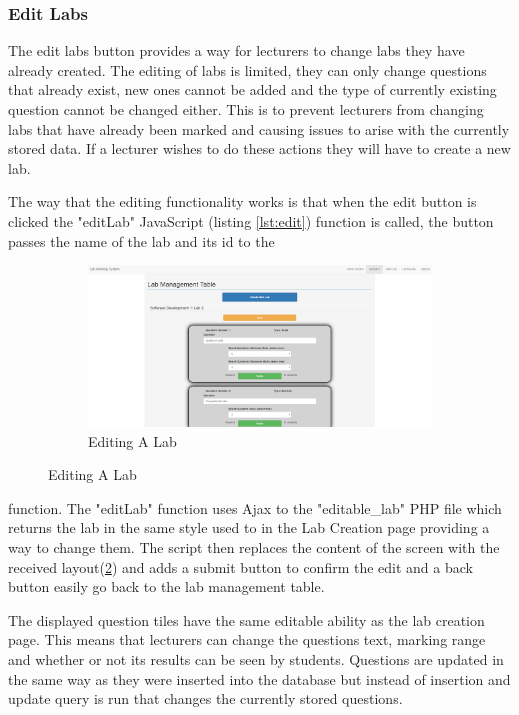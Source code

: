 \documentclass[12pt]{article}  %
\begin{document}
\subsubsection{Edit Labs}
The edit labs button provides a way for lecturers to change labs they have already created. The editing of labs is limited, they can only change questions that already exist, new ones cannot be added and the type of currently existing question cannot be changed either. This is to prevent lecturers from changing labs that have already been marked and causing issues to arise with the currently stored data. If a lecturer wishes to do these actions they will have to create a new lab.



\noindent The way that the editing functionality works is that when  the edit button is clicked the "editLab" JavaScript (listing \ref{lst:edit}) function is called, the button passes the name of the lab and its id to the

\begin{figure}
\vspace*{-\baselineskip}
\begin{figure}[H]
    \centering
    \includegraphics[width=1\textwidth]{images/implementation/edit-lab-page.png}
    \caption{Editing A Lab}
    \label{fig:edit-lab}
\end{figure}
\end{figure}

\noindent function. The "editLab" function uses Ajax to the "editable\_lab" PHP file which returns the lab in the same style used to in the Lab Creation page providing a way to change them. The script then replaces the content of the screen with the received layout(\ref{fig:edit-lab}) and adds a submit button to confirm the edit and a back button easily go back to the lab management table.

\noindent The displayed question tiles have the same editable ability as the lab creation page. This means that lecturers can change the questions text, marking range and whether or not its results can be seen by students. Questions are updated in the same way as they were inserted into the database but instead of insertion and update query is run that changes the currently stored questions.
\end{document}
